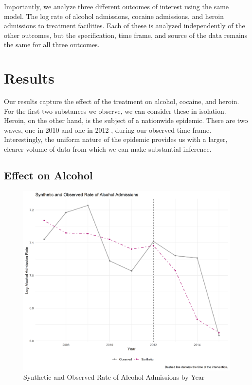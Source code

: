 \documentclass{article}
\begin{document}
Importantly, we analyze three different outcomes of interest using the same model. The log rate of alcohol admissions, cocaine admissions, and heroin admissions to treatment facilities. Each of these is analyzed independently of the other outcomes, but the specification, time frame, and source of the data remains the same for all three outcomes.

\section{Results}

Our results capture the effect of the treatment on alcohol, cocaine, and heroin. For the first two substances we observe, we can consider these in isolation. Heroin, on the other hand, is the subject of a nationwide epidemic. There are two waves, one in 2010 and one in 2012 \citep{CDCOpEpi}, during our observed time frame. Interestingly, the uniform nature of the epidemic provides us with a larger, clearer volume of data from which we can make substantial inference.

\subsection*{Effect on Alcohol}

\begin{figure}[H]
    \begin{center}
        \includegraphics[width=.85\textwidth]{Figure_Trend_Alcohol.png}
    \end{center}
    \caption{Synthetic and Observed Rate of Alcohol Admissions by Year}
    \label{fig:AlcTrend}
\end{figure}
\end{document}
